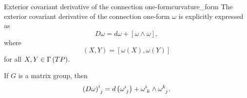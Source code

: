\begin{proposition}{Exterior covariant derivative of the connection one-form}{curvature_form}
    The exterior covariant derivative of the connection one-form \(\omega\) is explicitly expressed as
    \begin{equation*}
        D\omega = d\omega + [\omega \wedge \omega],
    \end{equation*}
    where
    \begin{equation*}
        [\omega \wedge \omega](X,Y) = [\omega(X), \omega(Y)]
    \end{equation*}
    for all \(X, Y \in \Gamma\left(TP\right)\).
\end{proposition}
\begin{remark}
    If \(G\) is a matrix group, then
    \begin{equation*}
        \left(D\omega\right)\indices{^i_j} = d\left(\omega\indices{^i_j}\right) + \omega\indices{^i_k}\wedge\omega\indices{^k_j}.
    \end{equation*}
\end{remark}
